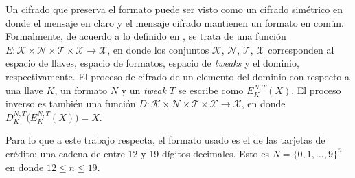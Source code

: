 Un cifrado que preserva el formato puede ser visto como un cifrado simétrico en
donde el mensaje en claro y el mensaje cifrado mantienen un formato en común.
Formalmente, de acuerdo a lo definido en \cite{DBLP:conf/sacrypt/BellareRRS09},
se trata de una función $ E: \mathcal{K} \times \mathcal{N} \times \mathcal{T}
\times \mathcal{X} \rightarrow \mathcal{X} $, en donde los conjuntos $
\mathcal{K} $, $ \mathcal{N} $, $ \mathcal{T} $, $ \mathcal{X} $ corresponden al
espacio de llaves, espacio de formatos, espacio de \textit{tweaks} y el dominio,
respectivamente. El proceso de cifrado de un elemento del dominio con respecto a
una llave $ K $, un formato $ N $ y un \textit{tweak} $ T $ se escribe como  $
E_K^{N,T}(X) $. El proceso inverso es también una función $ D: \mathcal{K}
\times \mathcal{N} \times \mathcal{T} \times \mathcal{X} \rightarrow
\mathcal{X} $, en donde $ D_K^{N,T}\big( E_K^{N,T}(X) \big) = X $.


Para lo que a este trabajo respecta, el formato usado es el de las tarjetas de
crédito: una cadena de entre 12 y 19 dígitos decimales. Esto es $ N = \{0, 1,
\dots, 9\}^n $ en donde $ 12 \leq n \leq 19 $.

